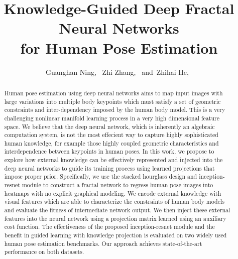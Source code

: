 \documentclass[journal ]{IEEEtran}
\begin{document}
\title{Knowledge-Guided Deep Fractal Neural Networks \\ for Human Pose Estimation}


\author{Guanghan Ning,~
        Zhi Zhang,~
        and~Zhihai He,~}



















\maketitle

\begin{abstract}
Human pose estimation using deep neural networks aims to map input images with large variations into multiple body keypoints which must satisfy a set of geometric constraints and inter-dependency imposed by the human body model. This is a very challenging nonlinear manifold learning process in a very high dimensional feature space. 
We believe that the deep neural network, which is inherently an algebraic computation system, is not the most effecient way to capture highly sophisticated human knowledge, for example those highly coupled geometric characteristics and interdependence between keypoints in human poses. 
In this work, we propose to explore how external knowledge can be effectively represented and injected into the deep neural networks to guide its training process using learned projections that impose proper prior. Specifically, we use the stacked hourglass design and inception-resnet module to construct a fractal network to regress human pose images into heatmaps with no explicit graphical modeling.
We encode external knowledge with visual features which are able to characterize the constraints of human body models and evaluate the fitness of intermediate network output. We then inject these external features into the neural network using a projection matrix learned using an auxiliary cost function. The effectiveness of the proposed inception-resnet module and the benefit in guided learning with knowledge projection is evaluated on two widely used human pose estimation benchmarks. Our approach achieves state-of-the-art performance on both datasets. 
\end{abstract}
\end{document}
